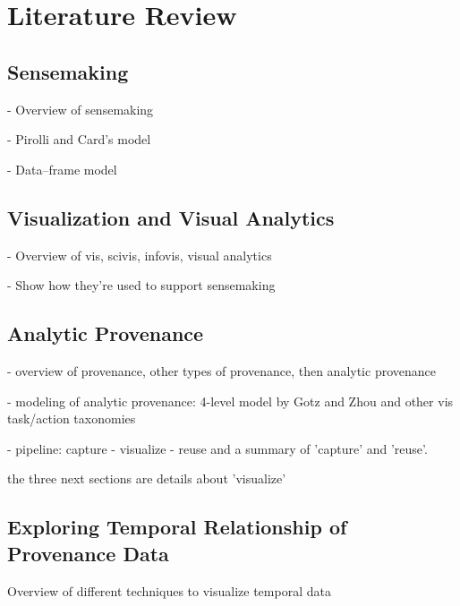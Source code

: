 
\graphicspath{{Chapter2/figures/}}

%
%
%
%


\chapter{Literature Review}
\section{Sensemaking}
- Overview of sensemaking

- Pirolli and Card's model

- Data--frame model

\section{Visualization and Visual Analytics}
- Overview of vis, scivis, infovis, visual analytics

- Show how they're used to support sensemaking

\section{Analytic Provenance}
- overview of provenance, other types of provenance, then analytic provenance

- modeling of analytic provenance: 4-level model by Gotz and Zhou and other vis task/action taxonomies

- pipeline: capture - visualize - reuse and a summary of 'capture' and 'reuse'.

the three next sections are details about 'visualize'

\section{Exploring Temporal Relationship of Provenance Data}
Overview of different techniques to visualize temporal data

